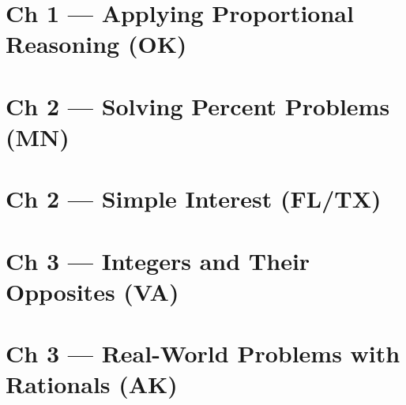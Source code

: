 \documentclass[12pt, fleqn, openany, oneside]{studyGuide}
\begin{document}

\chapter{Ch 1 — Applying Proportional Reasoning (OK)}



\chapter{Ch 2 — Solving Percent Problems (MN)}



\chapter{Ch 2 — Simple Interest (FL/TX)}



\chapter{Ch 3 — Integers and Their Opposites (VA)}



\chapter{Ch 3 — Real-World Problems with Rationals (AK)}



\end{document}
